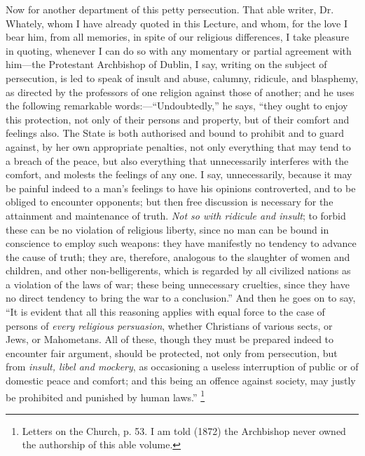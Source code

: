 Now for another department of this petty persecution.
That able writer, Dr. Whately, whom I have already quoted
in this Lecture, and whom, for the love I bear him, from
all memories, in spite of our religious differences, I
take pleasure in quoting, whenever I can do so with any
momentary or partial agreement with him—the
Protestant Archbishop of Dublin, I say, writing on the
subject of persecution, is led to speak of insult and
abuse, calumny, ridicule, and blasphemy, as directed by
the professors of one religion against those of another;
and he uses the following remarkable
words:—``Undoubtedly,'' he says, ``they
ought to enjoy this protection, not only of their persons
and property, but of their comfort and feelings also. The
State is both authorised and bound to prohibit and to
guard against, by her own appropriate penalties, not only
everything that may tend to a breach of the peace, but
also everything that unnecessarily interferes with the
comfort, and molests the feelings of any one. I say,
unnecessarily, because it may be painful indeed to a
man's feelings to have his opinions controverted, and to
be obliged to encounter opponents; but then free
discussion is necessary for the attainment and
maintenance of truth. \emph{Not so with ridicule and insult};
to forbid these can be no violation of religious liberty,
since no man can be bound in conscience to employ such
weapons: they have manifestly no tendency to advance the
cause of truth; they are, therefore, analogous to the
slaughter of women and children, and other
non-belligerents, which is regarded by all civilized
nations as a violation of the laws of war; these being
unnecessary cruelties, since they have no direct tendency
to bring the war to a conclusion.'' And then he goes
on to say, ``It is evident that all this reasoning
applies with equal force to the case of persons of \emph{every
religious persuasion}, whether Christians of various
sects, or Jews, or Mahometans. All of these, though they
must be prepared indeed to encounter fair argument,
should be protected, not only from persecution, but from \emph{insult,
libel and mockery}, as occasioning a useless
interruption of public or of domestic peace and comfort;
and this being an offence against society, may justly be
prohibited and punished by human laws.'' \footnote{Letters on the Church, p. 53. I
am told (1872) the Archbishop never owned the authorship
of this able volume.}

